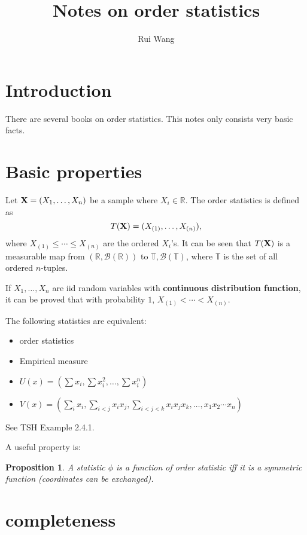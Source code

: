 \documentclass[11pt]{article}
\title{Notes on order statistics}
\author[1]{Rui Wang}
\theoremstyle{plain}
\newtheorem{proposition}{\quad\quad Proposition}
\theoremstyle{definition}
\theoremstyle{remark}
\begin{document}
\maketitle
\section{Introduction}
There are several books on order statistics.
This notes only consists very basic facts.



\section{Basic properties}

Let $\mathbf{X}=(X_1,\ldots,X_n)$ be a sample where $X_i\in\mathbb R$.
The order statistics is defined as
\begin{equation*}
    T(\mathbf{X})= (X_{(1)}, \ldots, X_{(n)}), 
\end{equation*}
where $X_{(1)}\leq \cdots \leq X_{(n)}$ are the ordered $X_i$'s.
It can be seen that $T(\mathbf{X})$ is a measurable map from $(\mathbb R,\mathcal B (\mathbb R))$ to $\mathbb T, \mathcal B (\mathbb T)$, where $\mathbb T$ is the set of all ordered $n$-tuples.

If $X_1,\ldots, X_n$ are iid random variables with \textbf{continuous distribution function}, it can be proved that with probability $1$, $X_{(1)}< \cdots < X_{(n)}$.


The following statistics are equivalent:
\begin{itemize}
    \item 
 order statistics
 \item
     Empirical measure
\item
 \(U(x)=(\sum x_i, \sum x_i^2,\ldots,\sum x_i^n)\)
\item
 \(V(x)=(\sum_i x_i,\sum_{i<j} x_i x_j, \sum_{i<j<k} x_i x_j x_k, \ldots, x_1 x_2 \cdots x_n)\)
\end{itemize}
See TSH Example 2.4.1.

A useful property is:

\begin{proposition}
A statistic \(\phi\) is a function of order statistic iff it is a symmetric function (coordinates can be exchanged).
\end{proposition}

\section{completeness}
\end{document}
